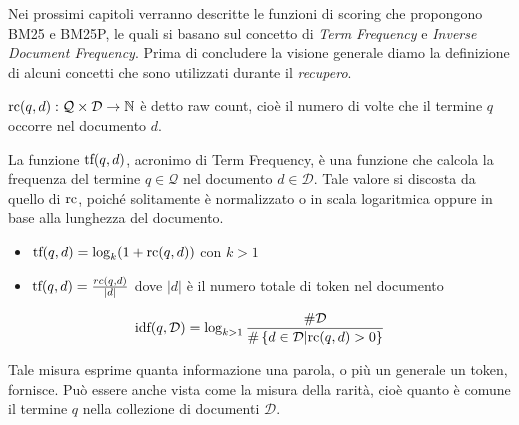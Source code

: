 \pagebreak

Nei prossimi capitoli verranno descritte le funzioni di scoring che propongono BM25 e BM25P, le quali si basano sul concetto di \textit{Term Frequency} e \textit{Inverse Document Frequency}.
Prima di concludere la visione generale diamo la definizione di alcuni concetti che sono utilizzati durante il \textit{recupero}.

\begin{definizione}\label{def:raw_count}
	$\text{rc}(q, d) : \mathcal{Q} \times \mathcal{D} \rightarrow \mathbb{N}$ è detto raw count, cioè il numero di volte che
	il termine $q$ occorre nel documento $d$.
\end{definizione}

\begin{definizione}\label{def:}
	La funzione $\text{tf}(q,d)$, acronimo di Term Frequency, è una funzione che calcola la frequenza del
	termine $q \in \mathcal{Q}$ nel documento $d \in \mathcal{D}$.
	Tale valore si discosta da quello di $\text{rc}$, poiché solitamente è normalizzato o in scala logaritmica
	oppure in base alla lunghezza del documento.
	
	\begin{itemize}
		\item $\text{tf}(q,d) = \log_{k}(1+\text{rc}(q,d))$ con $k>1$
		\item $\text{tf}(q,d) = \frac{rc(q,d)}{|d|}$ dove $|d|$ è il numero totale di token nel documento
	\end{itemize}
\end{definizione}

\begin{definizione}\label{def:idf}
	$$
	\text{idf}(q, \mathcal{D}) = \log_{k>1}{
		\frac{\#\mathcal{D}}{
			\#
			\left\{
			d \in \mathcal{D} \middle \lvert \text{rc}(q,d) > 0
			\right\} 
		}
	}
	$$
	
	Tale misura esprime quanta informazione una parola, o più un generale un token, fornisce.
	Può essere anche vista come la misura della rarità, cioè quanto è comune il termine $q$
	nella collezione di documenti $\mathcal{D}$.
\end{definizione}




